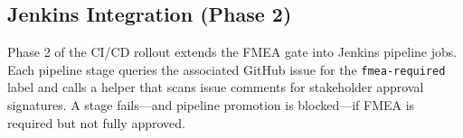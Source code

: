 \subsection{Jenkins Integration (Phase 2)}

Phase 2 of the CI/CD rollout extends the FMEA gate into Jenkins pipeline jobs. Each
pipeline stage queries the associated GitHub issue for the \texttt{fmea-required} label
and calls a helper that scans issue comments for stakeholder approval signatures. A stage
fails—and pipeline promotion is blocked—if FMEA is required but not fully approved.

